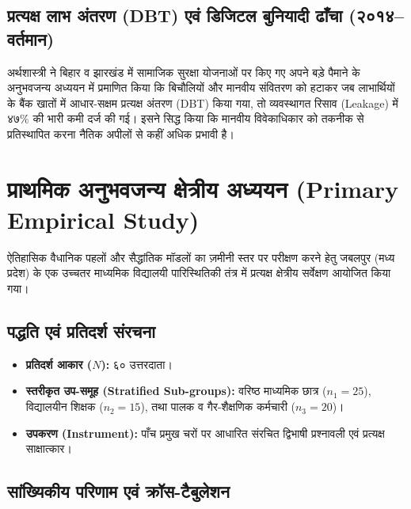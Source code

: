 \documentclass[11pt, a4paper]{article}
\begin{document}
\subsection{प्रत्यक्ष लाभ अंतरण (DBT) एवं डिजिटल बुनियादी ढाँचा (२०१४--वर्तमान)}
अर्थशास्त्री \citep{muralidharan2016} ने बिहार व झारखंड में सामाजिक सुरक्षा योजनाओं पर किए गए अपने बड़े पैमाने के अनुभवजन्य अध्ययन में प्रमाणित किया कि बिचौलियों और मानवीय संवितरण को हटाकर जब लाभार्थियों के बैंक खातों में आधार-सक्षम प्रत्यक्ष अंतरण (DBT) किया गया, तो व्यवस्थागत रिसाव (Leakage) में ४७\% की भारी कमी दर्ज की गई। इसने सिद्ध किया कि मानवीय विवेकाधिकार को तकनीक से प्रतिस्थापित करना नैतिक अपीलों से कहीं अधिक प्रभावी है।

\section{प्राथमिक अनुभवजन्य क्षेत्रीय अध्ययन (Primary Empirical Study)}

ऐतिहासिक वैधानिक पहलों और सैद्धांतिक मॉडलों का ज़मीनी स्तर पर परीक्षण करने हेतु जबलपुर (मध्य प्रदेश) के एक उच्चतर माध्यमिक विद्यालयी पारिस्थितिकी तंत्र में प्रत्यक्ष क्षेत्रीय सर्वेक्षण आयोजित किया गया।

\subsection{पद्धति एवं प्रतिदर्श संरचना}
\begin{itemize}
    \item \textbf{प्रतिदर्श आकार ($N$):} ६० उत्तरदाता।
    \item \textbf{स्तरीकृत उप-समूह (Stratified Sub-groups):} वरिष्ठ माध्यमिक छात्र ($n_1 = 25$), विद्यालयीन शिक्षक ($n_2 = 15$), तथा पालक व गैर-शैक्षणिक कर्मचारी ($n_3 = 20$)।
    \item \textbf{उपकरण (Instrument):} पाँच प्रमुख चरों पर आधारित संरचित द्विभाषी प्रश्नावली एवं प्रत्यक्ष साक्षात्कार।
\end{itemize}

\subsection{सांख्यिकीय परिणाम एवं क्रॉस-टैबुलेशन}
\end{document}

